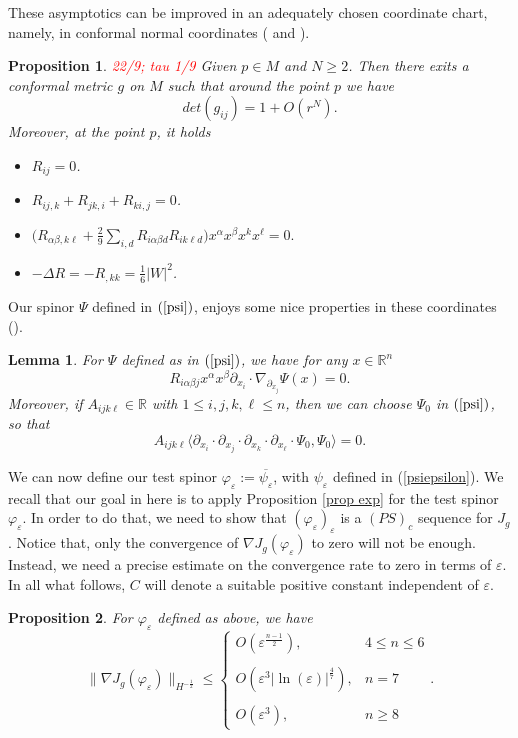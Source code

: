 \documentclass[11pt]{article}
\newtheorem{lemma}{Lemma}[section]
\newtheorem{proposition}{Proposition}[section]
\def \R {\mathbb{R}}
\begin{document}
{\noindent
These asymptotics can be improved in an adequately chosen coordinate chart, namely, in conformal normal coordinates (\cite{LP} and \cite{YX1}).

\begin{proposition}\label{proplp} {\textcolor{red}{ 22/9; tau 1/9 }}
Given $p\in M$ and $N\geq 2$. Then there exits a conformal metric $g$ on $M$ such that around the point $p$ we have
$$det(g_{ij})=1+O(r^{N}).$$
Moreover, at the point $p$, it holds
\begin{itemize}
\item[i)] $R_{ij}=0$.
\item[ii)] $R_{ij,k}+R_{jk,i}+R_{ki,j}=0$.
\item[iii)] $\Big(R_{\alpha \beta,k\ell}+\frac{2}{9}\sum \limits_{i,d}R_{i\alpha \beta d}R_{ik\ell d}\Big)x^{\alpha}x^{\beta}x^{k}x^{\ell}=0.$
\item[iv)] $-\Delta R=-R_{,kk}=\frac{1}{6}|W|^{2}$.
\end{itemize}
\end{proposition}


\noindent
Our spinor $\Psi$ defined in $(\ref{psi})$, enjoys some nice properties in these coordinates (\cite{YX1}).

\begin{lemma}\label{lemyx}
For $\Psi$ defined as in $(\ref{psi})$, we have for any $x\in \R^n$
$$R_{i\alpha\beta j}x^{\alpha}x^{\beta}\partial_{x_{i}}\cdot \nabla _{\partial_{x_{j}}}\Psi (x) =0.$$
Moreover, if $A_{ijk\ell}\in \R$ with $1\leq i,j,k,\ell \leq n$, then we can choose $\Psi_{0}$ in $(\ref{psi})$, so that
$$A_{ijk\ell}\langle \partial_{x_{i}}\cdot \partial_{x_{j}}\cdot \partial_{x_{k}}\cdot \partial_{x_{\ell}}\cdot \Psi_{0},\Psi_{0}\rangle =0.$$
\end{lemma}


\noindent
We can now define our test spinor $\varphi_{\varepsilon}:=\overline{\psi_{\varepsilon}}$, with $\psi_{\varepsilon}$ defined in (\ref{psiepsilon}). We recall that our goal in here is to apply Proposition \ref{prop exp} for the test spinor $\varphi_{\varepsilon}$.  In order to do that, we need to show that $(\varphi_{\varepsilon})_{\varepsilon}$ is a $(PS)_{c}$ sequence for $J_{g}$. Notice that, only the convergence of $\nabla J_{g}(\varphi_{\varepsilon})$ to zero will not be enough. Instead, we need a precise estimate on the convergence rate to zero in terms of $\varepsilon$. In all what follows, $C$ will denote a suitable positive constant independent of $\varepsilon$.

\begin{proposition}\label{lemma1 exp}
For $\varphi_{\varepsilon}$ defined as above, we have
$$\|\nabla J_{g}(\varphi_{\varepsilon})\|_{H^{-\frac{1}{2}}}\leq \left\{\begin{array}{ll}
O(\varepsilon^{\frac{n-1}{2}}), &  4\leq n\leq 6\\
\\
O(\varepsilon^{3}|\ln(\varepsilon)|^{\frac{4}{7}}), &  n=7\\
\\
O(\varepsilon^{3}), &  n\geq 8
\end{array}
\right. .$$
\end{proposition}

}
\end{document}
